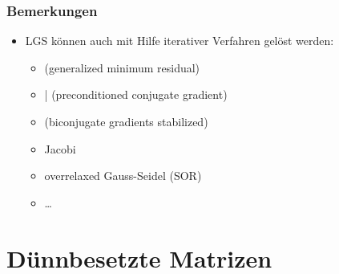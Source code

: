 \documentclass[hyperref={xetex}]{beamer}
\begin{document}
% 
%
\begin{frame}[fragile]\frametitle{Bemerkungen}
\begin{itemize}
\item LGS können auch mit Hilfe iterativer Verfahren gelöst werden:
\begin{itemize}
 \item {} (generalized minimum residual)
 \item {}|  (preconditioned conjugate gradient)
 \item {} (biconjugate gradients stabilized)
 \item Jacobi
 \item overrelaxed Gauss-Seidel (SOR)
\item \ldots
\end{itemize}
\end{itemize}
\end{frame}


\section{D\"unnbesetzte Matrizen}
\end{document}

